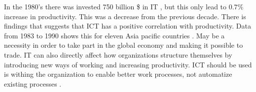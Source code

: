 In the 1980's there was invested 750 billion \$ in IT \cite{ca:ieeg}, but this only lead to \(0.7\%\) increase in productivity. This was a decrease from the previous decade.
There is findings that suggests that ICT has a positive correlation with productivity. Data from 1983 to 1990 shows this for eleven Asia pacific countries \cite{ca:ieeg}. May be a necessity in order to take part in the global economy and making it possible to trade. IT can also directly affect how organizations structure themselves by introducing new ways of working and increasing productivity.
ICT should be used is withing the organization to enable better work processes, not automatize existing processes \cite{mh:rw}. 
